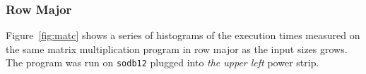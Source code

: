 \documentclass[10pt]{article}
\begin{document}
\clearpage
\pagebreak

\subsubsection{Row Major}

Figure~\ref{fig:matc} shows a series of 
histograms of the execution times measured on 
the same matrix multiplication program in row major as the input sizes grows. 
The program was run on {\tt sodb12} plugged into {\em the upper left} power strip.


%
\end{document}

